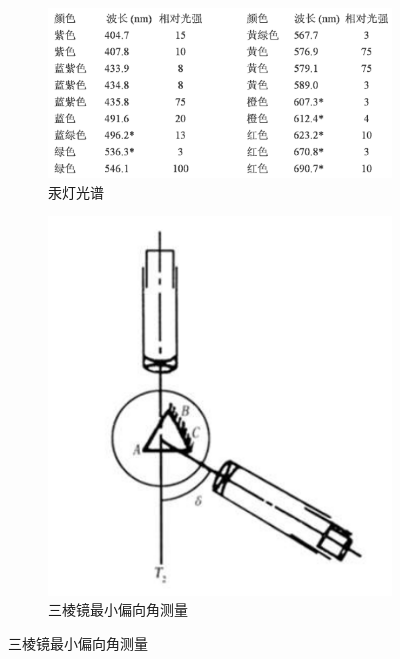 \documentclass{ctexart}
\begin{document}
\begin{figure}[H]
  \centering
  \begin{subfigure}{.65\textwidth}
    \centering
    \includegraphics[width=\linewidth]{figures/汞灯光谱}
    \caption{汞灯光谱}
  \end{subfigure}
  \begin{subfigure}{.3\textwidth}
    \centering
    \includegraphics[width=\linewidth]{figures/三棱镜最小偏向角测量}
    \caption{三棱镜最小偏向角测量}
  \end{subfigure}
\end{figure}
\end{document}
